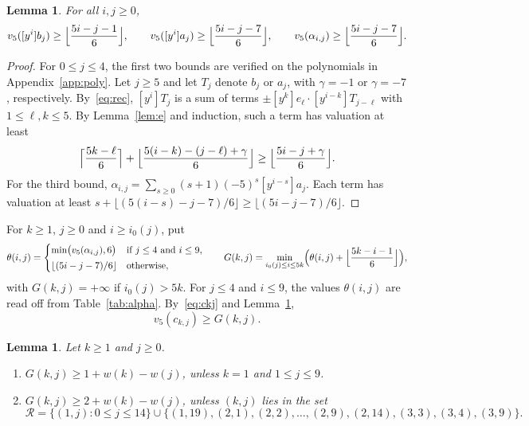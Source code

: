 \documentclass[11pt]{article}
\newtheorem{lemma}[theorem]{Lemma}
\theoremstyle{definition}
\theoremstyle{remark}
\numberwithin{equation}{section}
\begin{document}
\begin{lemma}\label{lem:linear}
For all $i,j\ge0$,
\[
v_5([y^i]b_j)\ge\Bigl\lfloor\frac{5i-j-1}6\Bigr\rfloor,\qquad
v_5([y^i]a_j)\ge\Bigl\lfloor\frac{5i-j-7}6\Bigr\rfloor,\qquad
v_5(\alpha_{i,j})\ge\Bigl\lfloor\frac{5i-j-7}6\Bigr\rfloor.
\]
\end{lemma}

\begin{proof}
For $0\le j\le4$, the first two bounds are verified on the polynomials in Appendix~\ref{app:poly}. Let $j\ge5$ and let $T_j$ denote $b_j$ or $a_j$, with $\gamma=-1$ or $\gamma=-7$, respectively. By~\eqref{eq:rec}, $[y^i]T_j$ is a sum of terms $\pm[y^k]e_\ell\cdot[y^{i-k}]T_{j-\ell}$ with $1\le\ell,k\le5$. By Lemma~\ref{lem:e} and induction, such a term has valuation at least
\[
\Bigl\lceil\frac{5k-\ell}6\Bigr\rceil+\Bigl\lfloor\frac{5(i-k)-(j-\ell)+\gamma}6\Bigr\rfloor\ge\Bigl\lfloor\frac{5i-j+\gamma}6\Bigr\rfloor.
\]
For the third bound, $\alpha_{i,j}=\sum_{s\ge0}(s+1)(-5)^s[y^{i-s}]a_j$. Each term has valuation at least $s+\lfloor(5(i-s)-j-7)/6\rfloor\ge\lfloor(5i-j-7)/6\rfloor$.
\end{proof}

For $k\ge1$, $j\ge0$ and $i\ge i_0(j)$, put
\[
\theta(i,j)=\begin{cases}\min\bigl(v_5(\alpha_{i,j}),6\bigr)&\text{if }j\le4\text{ and }i\le9,\\[2pt] \lfloor(5i-j-7)/6\rfloor&\text{otherwise},\end{cases}
\qquad
G(k,j)=\min_{i_0(j)\le i\le5k}\Bigl(\theta(i,j)+\Bigl\lfloor\frac{5k-i-1}6\Bigr\rfloor\Bigr),
\]
with $G(k,j)=+\infty$ if $i_0(j)>5k$. For $j\le4$ and $i\le9$, the values $\theta(i,j)$ are read off from Table~\ref{tab:alpha}. By~\eqref{eq:ckj} and Lemma~\ref{lem:linear},
\begin{equation}\label{eq:G}
v_5(c_{k,j})\ge G(k,j).
\end{equation}

\begin{lemma}\label{lem:G}
Let $k\ge1$ and $j\ge0$.
\begin{enumerate}[label=\textup{(\alph*)}]
\item $G(k,j)\ge1+w(k)-w(j)$, unless $k=1$ and $1\le j\le9$.
\item $G(k,j)\ge2+w(k)-w(j)$, unless $(k,j)$ lies in the set
\[
\mathcal{R}=\{(1,j):0\le j\le14\}\cup\{(1,19),(2,1),(2,2),\dots,(2,9),(2,14),(3,3),(3,4),(3,9)\}.
\]
\end{enumerate}
\end{lemma}
\end{document}
